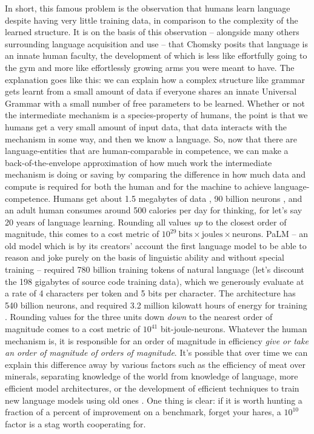  In short, this famous problem is the observation that humans learn language despite having very little training data, in comparison to the complexity of the learned structure. It is on the basis of this observation -- alongside many others surrounding language acquisition and use -- that Chomsky posits \citep{chomskyNewHorizonsStudy2000a} that language is an innate human faculty, the development of which is less like effortfully going to the gym and more like effortlessly growing arms you were meant to have. The explanation goes like this: we can explain how a complex structure like grammar gets learnt from a small amount of data if everyone shares an innate Universal Grammar with a small number of free parameters to be learned. Whether or not the intermediate mechanism is a species-property of humans, the point is that we humans get a very small amount of input data, that data interacts with the mechanism in some way, and then we know a language. So, now that there are language-entities that are human-comparable in competence, we can make a back-of-the-envelope approximation of how much work the intermediate mechanism is doing or saving by comparing the difference in how much data and compute is required for both the human and for the machine to achieve language-competence. Humans get about 1.5 megabytes of data \citep{mollicaHumansStoreMegabytes2019}, 90 billion neurons \citep{herculano-houzelRemarkableNotExtraordinary2012}, and an adult human consumes around 500 calories per day for thinking, for let's say 20 years of language learning. Rounding all values \emph{up} to the closest order of magnitude, this comes to a cost metric of $10^{29} \ \text{bits} \times \text{joules} \times \text{neurons}$. PaLM -- an old model which is by its creators' account the first language model to be able to reason and joke purely on the basis of linguistic ability and without special training \citep{chowdheryPaLMScalingLanguage2022,narangPathwaysLanguageModel2022} -- required 780 billion training tokens of natural language (let's discount the 198 gigabytes of source code training data), which we generously evaluate at a rate of 4 characters per token \citep{khanWhatAreTokens2023} and 5 bits per character. The architecture has 540 billion neurons, and required 3.2 million kilowatt hours of energy for training \citep{tomgoldstein[@tomgoldsteincs]TrainingPaLMTakes2022}. Rounding values for the three units down \emph{down} to the nearest order of magnitude comes to a cost metric of $10^{41}$ bit-joule-neurons. Whatever the human mechanism is, it is responsible for an order of magnitude in efficiency \emph{give or take an order of magnitude of orders of magnitude}. It's possible that over time we can explain this difference away by various factors such as the efficiency of meat over minerals, separating knowledge of the world from knowledge of language, more efficient model architectures, or the development of efficient techniques to train new language models using old ones \citep{taorirohanStanfordCRFM2023}. One thing is clear: if it is worth hunting a fraction of a percent of improvement on a benchmark, forget your hares, a $10^{10}$ factor is a stag worth cooperating for.

